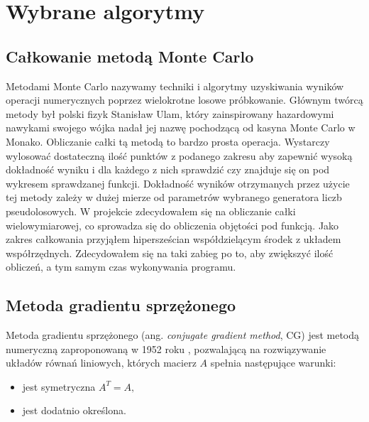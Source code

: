 \documentclass[a4paper,12pt]{book} %
\begin{document}
\section{Wybrane algorytmy}
\subsection{Całkowanie metodą Monte Carlo}
Metodami Monte Carlo nazywamy techniki i algorytmy uzyskiwania wyników operacji numerycznych poprzez wielokrotne losowe próbkowanie. Głównym twórcą metody był polski fizyk Stanisław Ulam, który zainspirowany hazardowymi nawykami swojego wójka nadał jej nazwę pochodzącą od kasyna Monte Carlo w Monako.\cite{mc_beggining}
Obliczanie całki tą metodą to bardzo prosta operacja. Wystarczy wylosować dostateczną ilość punktów z podanego zakresu aby zapewnić wysoką dokładność wyniku i dla każdego z nich sprawdzić czy znajduje się on pod wykresem sprawdzanej funkcji. Dokładność wyników otrzymanych przez użycie tej metody zależy w dużej mierze od parametrów wybranego generatora liczb pseudolosowych.
W projekcie zdecydowałem się na obliczanie całki wielowymiarowej, co sprowadza się do obliczenia objętości pod funkcją. Jako zakres całkowania przyjąłem hipersześcian współdzielącym środek z układem współrzędnych. Zdecydowałem się na taki zabieg po to, aby zwiększyć ilość obliczeń, a tym samym czas wykonywania programu.
\subsection{Metoda gradientu sprzężonego}
Metoda gradientu sprzężonego (ang. \emph{conjugate gradient method}, CG) jest metodą numeryczną zaproponowaną w 1952 roku \cite{conjugate-gradient}, pozwalającą na rozwiązywanie układów równań liniowych, których macierz $A$ spełnia następujące warunki:
\begin{itemize}
\item jest symetryczna $A^T=A,$
\item jest dodatnio określona.
\end{itemize}
\end{document}
